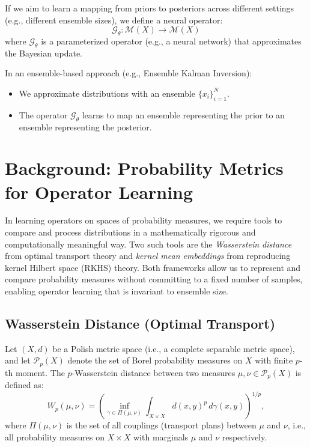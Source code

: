 \documentclass[twoside,11pt]{article}
\begin{document}
If we aim to learn a mapping from priors to posteriors across different settings (e.g., different ensemble sizes), we define a neural operator:
\[
\mathcal{G}_\theta: \mathcal{M}(X) \to \mathcal{M}(X)
\]
where \( \mathcal{G}_\theta \) is a parameterized operator (e.g., a neural network) that approximates the Bayesian update.

In an ensemble-based approach (e.g., Ensemble Kalman Inversion):
\begin{itemize}
    \item We approximate distributions with an ensemble \( \{ x_i \}_{i=1}^N \).
    \item The operator \( \mathcal{G}_\theta \) learns to map an ensemble representing the prior to an ensemble representing the posterior.
\end{itemize}



\section{Background: Probability Metrics for Operator Learning}

In learning operators on spaces of probability measures, we require tools to compare and process distributions in a mathematically rigorous and computationally meaningful way. Two such tools are the \emph{Wasserstein distance} from optimal transport theory and \emph{kernel mean embeddings} from reproducing kernel Hilbert space (RKHS) theory. Both frameworks allow us to represent and compare probability measures without committing to a fixed number of samples, enabling operator learning that is invariant to ensemble size.

\subsection{Wasserstein Distance (Optimal Transport)}

Let $(X, d)$ be a Polish metric space (i.e., a complete separable metric space), and let $\mathcal{P}_p(X)$ denote the set of Borel probability measures on $X$ with finite $p$-th moment. The $p$-Wasserstein distance between two measures $\mu, \nu \in \mathcal{P}_p(X)$ is defined as:
\begin{equation}
W_p(\mu, \nu) = \left( \inf_{\gamma \in \Pi(\mu, \nu)} \int_{X \times X} d(x, y)^p \, d\gamma(x, y) \right)^{1/p},
\end{equation}
where $\Pi(\mu, \nu)$ is the set of all couplings (transport plans) between $\mu$ and $\nu$, i.e., all probability measures on $X \times X$ with marginals $\mu$ and $\nu$ respectively.
\end{document}
